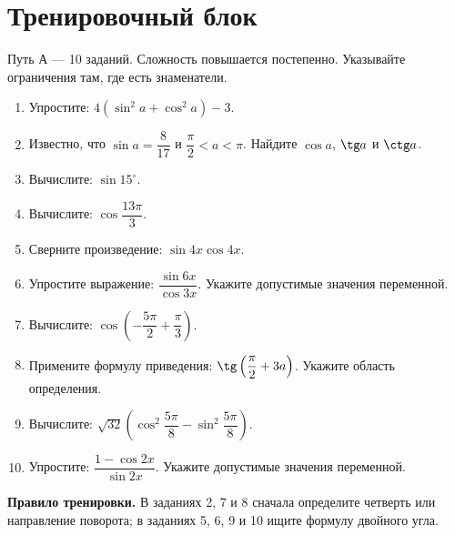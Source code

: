\documentclass[a4paper,12pt]{article}
\newcommand{\sectionheading}[1]{\section*{\textcolor{darkaccent}{#1}}}
\begin{document}
\sectionheading{Тренировочный блок}
\textcolor{muted}{Путь А --- 10 заданий. Сложность повышается постепенно. Указывайте ограничения там, где есть знаменатели.}
\begin{enumerate}[label=\textbf{\arabic*.},itemsep=6pt]
\item Упростите: $4(\sin^2a+\cos^2a)-3$.
\item Известно, что $\sin a=\dfrac8{17}$ и $\dfrac\pi2<a<\pi$.
Найдите $\cos a$, $\tg a$ и $\ctg a$.
\item Вычислите: $\sin15^\circ$.
\item Вычислите: $\cos\dfrac{13\pi}{3}$.
\item Сверните произведение: $\sin4x\cos4x$.
\item Упростите выражение: $\dfrac{\sin6x}{\cos3x}$.
Укажите допустимые значения переменной.
\item Вычислите: $\cos\left(-\dfrac{5\pi}{2}+\dfrac\pi3\right)$.
\item Примените формулу приведения:
$\tg\left(\dfrac\pi2+3a\right)$.
Укажите область определения.
\item Вычислите:
$\sqrt{32}\left(\cos^2\dfrac{5\pi}{8}-\sin^2\dfrac{5\pi}{8}\right)$.
\item Упростите:
$\dfrac{1-\cos2x}{\sin2x}$.
Укажите допустимые значения переменной.
\end{enumerate}
\vspace{4mm}
\textcolor{darkaccent}{\textbf{Правило тренировки.}}
В заданиях 2, 7 и 8 сначала определите четверть или направление поворота;
в заданиях 5, 6, 9 и 10 ищите формулу двойного угла.
\end{document}
